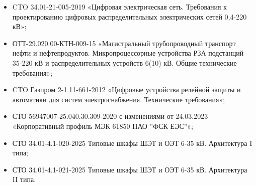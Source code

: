 \begin{itemize}
\item CTO 34.01-21-005-2019 «Цифровая электрическая сеть. Требования к проектированию цифровых распределительных электрических сетей 0,4-220 кВ»;
\item \sloppy ОТТ-29.020.00-КТН-009-15 «Магистральный трубопроводный транспорт нефти и нефтепродуктов. Микропроцессорные устройства РЗА подстанций 35-220 кВ и распределительных устройств 6(10) кВ. Общие технические требования»;
\item CTO Газпром 2-1.11-661-2012 «Цифровые устройства релейной защиты и автоматики для систем электроснабжения. Технические требования»;
\item СТО 56947007-25.040.30.309-2020 с изменениями от 24.03.2023 «Корпоративный профиль МЭК 61850 ПАО ''ФСК ЕЭС''»;
\item СТО 34.01-4.1-020-2025 Типовые шкафы ШЭТ и ОЭТ 6-35 кВ. Архитектура I типа;
\item СТО 34.01-4.1-021-2025 Типовые шкафы ШЭТ и ОЭТ 6-35 кВ. Архитектура II типа.

\end{itemize}



